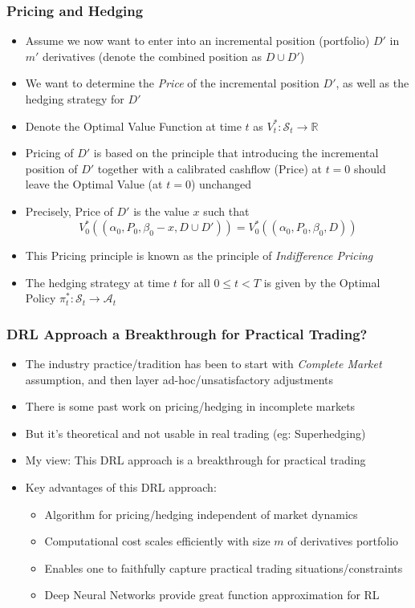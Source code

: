 \documentclass[handout]{beamer}
\begin{document}
\begin{frame}
\frametitle{Pricing and Hedging}
\pause
\begin{itemize}[<+->]
\item Assume we now want to enter into an incremental position (portfolio) $D'$ in $m'$ derivatives (denote the combined position as $D \cup D'$)
\item We want to determine the {\em Price} of the incremental position $D'$, as well as the hedging strategy for $D'$
\item Denote the Optimal Value Function at time $t$ as $V_t^* : \mathcal{S}_t \rightarrow \mathbb{R}$
\item Pricing of $D'$ is based on the principle that introducing the incremental position of $D'$ together with a calibrated cashflow (Price) at $t=0$ should leave the Optimal Value (at $t=0$) unchanged
\item Precisely, Price of $D'$ is the value $x$ such that
$$V_0^*((\alpha_0,P_0,\beta_0-x,D\cup D')) = V_0^*((\alpha_0, P_0, \beta_0, D))$$
\item This Pricing principle is known as the principle of {\em Indifference Pricing}
\item The hedging strategy at time $t$ for all $0 \leq t < T$ is given by the Optimal Policy $\pi_t^* : \mathcal{S}_t \rightarrow \mathcal{A}_t$
\end{itemize}
\end{frame}

\begin{frame}
\frametitle{DRL Approach a Breakthrough for Practical Trading?}
\pause
\begin{itemize}[<+->]
\item The industry practice/tradition has been to start with {\em Complete Market} assumption, and then layer ad-hoc/unsatisfactory adjustments
\item There is some past work on pricing/hedging in incomplete markets
\item But it's theoretical and not usable in real trading (eg: Superhedging)
\item My view: This DRL approach is a breakthrough for practical trading
\item Key advantages of this DRL approach:
\begin{itemize}
\item Algorithm for pricing/hedging independent of market dynamics
\item Computational cost scales efficiently with size $m$ of derivatives portfolio
\item Enables one to faithfully capture practical trading situations/constraints
\item Deep Neural Networks provide great function approximation for RL 
\end{itemize}
\end{itemize}

\end{frame}
\end{document}
